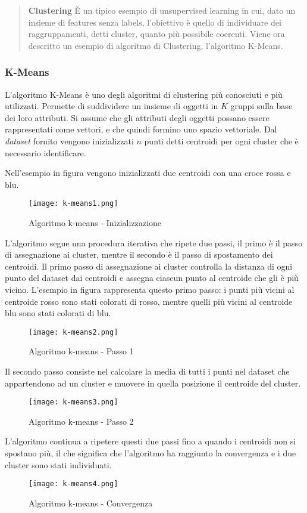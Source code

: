 \documentclass[../main.tex]{subfiles}
\begin{document}
\begin{verse}
				\textbf{Clustering} È un tipico esempio di unsupervised learning in cui, dato un insieme di features senza labels, l'obiettivo è quello di individuare dei raggruppamenti, detti cluster, quanto più possibile coerenti. Viene ora descritto un esempio di algoritmo di Clustering, l'algoritmo K-Means.
\end{verse}	

\subsubsection{K-Means}
L'algoritmo K-Means è uno degli algoritmi di clustering più conosciuti e più utilizzati. Permette di suddividere un insieme di oggetti in $K$ gruppi sulla base dei loro attributi.
Si assume che gli attributi degli oggetti possano essere rappresentati come vettori, e che quindi formino uno spazio vettoriale. Dal \textit{dataset} fornito vengono inizializzati $n$ punti detti centroidi per ogni cluster che è necessario identificare.

Nell'esempio in figura vengono inizializzati due centroidi con una croce rossa e blu.

\begin{figure}[H]
				\centering
				\texttt{[image: k-means1.png]}
				\caption{Algoritmo k-means - Inizializzazione}
\end{figure}

L'algoritmo segue una procedura iterativa che ripete due passi, il primo è il passo di assegnazione ai cluster, mentre il secondo è il passo di spostamento dei centroidi.
Il primo passo di assegnazione ai cluster controlla la distanza di ogni punto del dataset dai centroidi e assegna ciascun punto al centroide che gli è più vicino. 
L'esempio in figura rappresenta questo primo passo: i punti più vicini al centroide rosso sono stati colorati di rosso, mentre quelli più vicini al centroide blu sono stati colorati di blu.

\begin{figure}[H]
				\centering
				\texttt{[image: k-means2.png]}
				\caption{Algoritmo k-means - Passo 1}
\end{figure}

Il secondo passo consiste nel calcolare la media di tutti i punti nel dataset che appartendono ad un cluster e muovere in quella posizione il centroide del cluster.

\begin{figure}[H]
				\centering
				\texttt{[image: k-means3.png]}
				\caption{Algoritmo k-means - Passo 2}
\end{figure}

L'algoritmo continua a ripetere questi due passi fino a quando i centroidi non si spostano più, il che significa che l'algoritmo ha raggiunto la convergenza e i due cluster sono stati individuati.

\begin{figure}[H]
				\centering
				\texttt{[image: k-means4.png]}
				\caption{Algoritmo k-means - Convergenza}
\end{figure}
\end{document}
